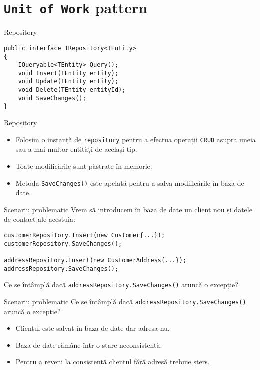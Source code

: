 \documentclass[presentation]{beamer}
\begin{document}
\section{\texttt{Unit of Work} pattern}
\label{sec:org9ad2299}
\begin{frame}[label={sec:orgc10079d},fragile]{Repository}
 \begin{verbatim}
public interface IRepository<TEntity>
{
    IQueryable<TEntity> Query();
    void Insert(TEntity entity);
    void Update(TEntity entity);
    void Delete(TEntity entityId);
    void SaveChanges();
}
\end{verbatim}
\end{frame}
\begin{frame}[label={sec:org90f9555},fragile]{Repository}
 \begin{itemize}
\item Folosim o instanță de \texttt{repository} pentru a efectua operații \texttt{CRUD} asupra uneia sau a mai multor entități de același tip.
\item Toate modificările sunt păstrate în memorie.
\item Metoda \texttt{SaveChanges()} este apelată pentru a salva modificările în baza de date.
\end{itemize}
\end{frame}
\begin{frame}[label={sec:orgf7aa133},fragile]{Scenariu problematic}
 Vrem să introducem în baza de date un client nou și datele de contact ale acestuia:

\begin{verbatim}
customerRepository.Insert(new Customer{...});
customerRepository.SaveChanges();

addressRepository.Insert(new CustomerAddress{...});
addressRepository.SaveChanges();
\end{verbatim}
\pause
Ce se întâmplă dacă \texttt{addressRepository.SaveChanges()} aruncă o excepție?
\end{frame}
\begin{frame}[label={sec:org5744ed9},fragile]{Scenariu problematic}
 Ce se întâmplă dacă \texttt{addressRepository.SaveChanges()} aruncă o excepție?
\begin{itemize}
\item Clientul este salvat în baza de date dar adresa nu.
\item Baza de date rămâne într-o stare neconsistentă.
\item Pentru a reveni la consistență clientul fără adresă trebuie șters.
\end{itemize}
\end{frame}
\end{document}
